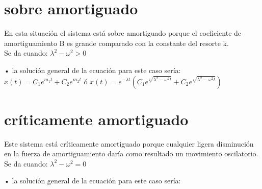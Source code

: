 \documentclass[12pt,a4paper]{article}
\begin{document}
\section{sobre amortiguado}
En esta situación el sistema está sobre amortiguado porque
el coeficiente de amortiguamiento B es grande comparado con la constante del resorte k.\\ 
 
 \vspace{0.6cm}
Se da cuando: \hspace{0.8cm}   $\lambda^{2}  - \omega^{2} > 0$

 \vspace{0.6cm}
 • la solución general de la ecuación para este caso sería:\\
 
 $x(t) = C_{1}e^{m_{1}t} + C_{2}e^{m_{2}t}$ \hspace{0.8cm} ó \hspace{0.8cm} $x(t) = e^{-\lambda t}(C_{1}e^{\sqrt{\lambda^{2}-\omega^{2}t}} + C_{2}e^{\sqrt{\lambda^{2}-\omega^{2}t}} )$

\begin{figure}[H]

        \centering

\end{figure}





\section{críticamente amortiguado}
Este sistema está críticamente amortiguado porque cualquier ligera disminución en la fuerza de amortiguamiento daría como resultado un movimiento oscilatorio.\\

 \vspace{0.6cm}
Se da cuando: \hspace{0.8cm}   $\lambda^{2}  - \omega^{2} = 0$

\vspace{0.6cm}
 • la solución general de la ecuación para este caso sería:\\
 
\end{document}
